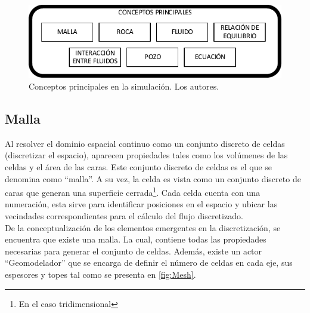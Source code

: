 \begin{figure}[h]
	\centering%
	\includegraphics[width=0.9\linewidth]{Fig/Conceptos.pdf}%
	\caption[Conceptos principales en la simulación.]{Conceptos principales en la simulación. Los autores.} \label{fig:Concepts}
\end{figure}

\subsection{Malla}
Al resolver el dominio espacial continuo como un conjunto discreto de celdas (discretizar el espacio), aparecen propiedades tales como los volúmenes de las celdas y el área de las caras. Este conjunto discreto de celdas es el que se denomina como ``malla''. A su vez, la celda es vista como un conjunto discreto de caras que generan una superficie cerrada\footnote{En el caso tridimensional}. Cada celda cuenta con una numeración, esta sirve para identificar posiciones en el espacio y ubicar las vecindades correspondientes para el cálculo del flujo discretizado.\\

De la conceptualización de los elementos emergentes en la discretización, se encuentra que existe una malla. La cual, contiene todas las propiedades necesarias para generar el conjunto de celdas. Además, existe un actor ``Geomodelador'' que se encarga de definir el número de celdas en cada eje, sus espesores y topes tal como se presenta en \ref{fig:Mesh}. \\


